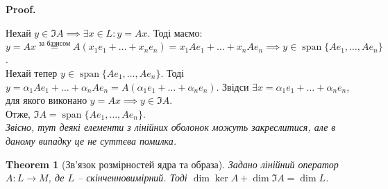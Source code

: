 \documentclass[a4paper, 10pt]{article}
\makeatletter
\theoremstyle{theoremdd}
\newtheorem{theorem}{Theorem}[subsection]
\DeclareMathOperator{\linspan}{span}
\renewenvironment{proof}[1][Proof.\\]{\par
\pushQED{\hfill \qed}%
\normalfont \topsep6\p@\@plus6\p@\relax
\trivlist
\item\relax
{\bfseries
#1\@addpunct{.}}\hspace\labelsep\ignorespaces
}{%
\popQED\endtrivlist\@endpefalse
}
\makeatother
\begin{document}
	\begin{proof}
	Нехай $y \in \Im A \implies \exists x \in L: y = Ax$. Тоді маємо:\\
	$y = Ax \overset{\textrm{за базисом}}{=} A(x_1e_1 + \dots + x_n e_n) = x_1 Ae_1 + \dots + x_n A e_n \implies y \in \linspan\{Ae_1,\dots,Ae_n\}$.\\
	Нехай тепер $y \in \linspan\{Ae_1,\dots,Ae_n\}$. Тоді $y = \alpha_1 Ae_1 + \dots + \alpha_n Ae_n = A(\alpha_1 e_1 + \dots + \alpha_n e_n)$. Звідси $\exists x = \alpha_1 e_1 + \dots + \alpha_n e_n$, для якого виконано $y = Ax \implies y \in \Im A$.\\
	Отже, $\Im A = \linspan \{Ae_1, \dots, Ae_n \}$.\\
	\textit{Звісно, тут деякі елементи з лінійних оболонок можуть закреслитися, але в даному випадку це не суттєва помилка.}
	\end{proof}
	
	\begin{theorem}[Зв'язок розмірностей ядра та образа]
	Задано лінійний оператор $A \colon L \to M$, де $L$ -- скінченновимірний. Тоді $\dim \ker A + \dim \Im A = \dim L$.
	\end{theorem}
	
\end{document}
